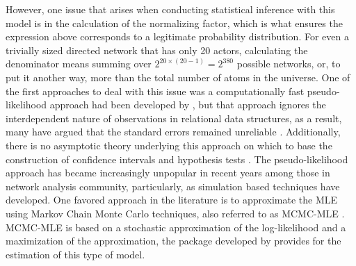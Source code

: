 However, one issue that arises when conducting statistical inference with this model is in the calculation of the normalizing factor, which is what ensures the expression above corresponds to a legitimate probability distribution. For even a trivially sized directed network that has only 20 actors, calculating the denominator means summing over $2^{20\times(20-1)} = 2^{380}$ possible networks, or, to put it another way, more than the total number of atoms in the universe. One of the first approaches to deal with this issue was a computationally fast pseudo-likelihood approach had been developed by \citet{strauss:iked:1990}, but that approach ignores the interdependent nature of observations in relational data structures, as a result, many have argued that the standard errors remained unreliable \citep{lubbers:snijders:2007,robins:etal:2007b,vanduijn:etal:2009}. Additionally, there is no asymptotic theory underlying this approach on which to base the construction of confidence intervals and hypothesis tests \citep{kolaczyk:2009}. The pseudo-likelihood approach has became increasingly unpopular in recent years among those in network analysis community, particularly, as simulation based techniques have developed. One favored approach in the literature is to approximate the MLE using Markov Chain Monte Carlo techniques, also referred to as MCMC-MLE \citep{geyer:thompson:1992,snijders:2002,handcock:2003b}. MCMC-MLE is based on a stochastic approximation of the log-likelihood and a maximization of the approximation, the  package developed by \citet{hunter:etal:2008} provides for the estimation of this type of model.

